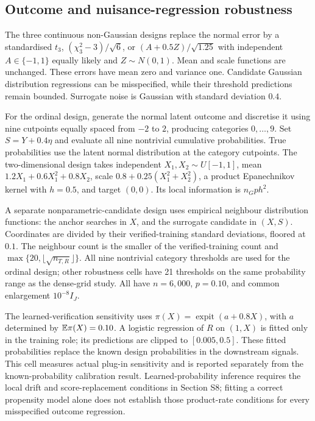 \subsection{Outcome and nuisance-regression robustness}
The three continuous non-Gaussian designs replace the normal error by a standardised $t_3$, $(\chi^2_3-3)/\sqrt6$, or $(A+0.5Z)/\sqrt{1.25}$ with independent $A\in\{-1,1\}$ equally likely and $Z\sim N(0,1)$. Mean and scale functions are unchanged. These errors have mean zero and variance one. Candidate Gaussian distribution regressions can be misspecified, while their threshold predictions remain bounded. Surrogate noise is Gaussian with standard deviation $0.4$.

For the ordinal design, generate the normal latent outcome and discretise it using nine cutpoints equally spaced from $-2$ to $2$, producing categories $0,\ldots,9$. Set $S=Y+0.4\eta$ and evaluate all nine nontrivial cumulative probabilities. True probabilities use the latent normal distribution at the category cutpoints. The two-dimensional design takes independent $X_1,X_2\sim U[-1,1]$, mean $1.2X_1+0.6X_1^2+0.8X_2$, scale $0.8+0.25(X_1^2+X_2^2)$, a product Epanechnikov kernel with $h=0.5$, and target $(0,0)$. Its local information is $n_Gph^2$.

A separate nonparametric-candidate design uses empirical neighbour distribution functions: the anchor searches in $X$, and the surrogate candidate in $(X,S)$. Coordinates are divided by their verified-training standard deviations, floored at $0.1$. The neighbour count is the smaller of the verified-training count and $\max\{20,\lfloor\sqrt{n_{T,R}}\rfloor\}$. All nine nontrivial category thresholds are used for the ordinal design; other robustness cells have 21 thresholds on the same probability range as the dense-grid study. All have $n=6,000$, $p=0.10$, and common enlargement $10^{-8}I_J$.

The learned-verification sensitivity uses
$\pi(X)=\operatorname{expit}(a+0.8X)$, with $a$ determined by $\mathbb E\pi(X)=0.10$. A logistic regression of $R$ on $(1,X)$ is fitted only in the training role; its predictions are clipped to $[0.005,0.5]$. These fitted probabilities replace the known design probabilities in the downstream signals. This cell measures actual plug-in sensitivity and is reported separately from the known-probability calibration result. Learned-probability inference requires the local drift and score-replacement conditions in Section S8; fitting a correct propensity model alone does not establish those product-rate conditions for every misspecified outcome regression.

